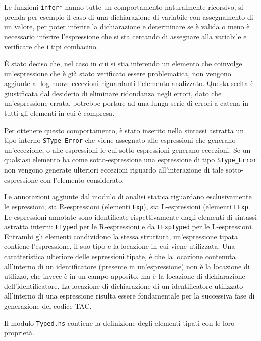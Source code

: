 Le funzioni \texttt{infer*} hanno tutte un comportamento naturalmente ricorsivo, si prenda per esempio il caso di una dichiarazione di variabile con assegnamento di un valore, per poter inferire la dichiarazione e determinare se è valida o meno è necessario inferire l'espressione che si sta cercando di assegnare alla variabile e verificare che i tipi combacino.

È stato deciso che, nel caso in cui si stia inferendo un elemento che coinvolge un'espressione che è già stato verificato essere problematica, non vengono aggiunte al log nuove eccezioni riguardanti l'elemento analizzato. Questa scelta è giustificata dal desiderio di eliminare ridondanza negli errori, dato che un'espressione errata, potrebbe portare ad una lunga serie di errori a catena in tutti gli elementi in cui è compresa.

Per ottenere questo comportamento, è stato inserito nella sintassi astratta un tipo interno \texttt{SType\_Error} che viene assegnato alle espressioni che generano un'eccezione, o alle espressioni le cui sotto-espressioni generano eccezioni. Se un qualsiasi elemento ha come sotto-espressione una espressione di tipo \texttt{SType\_Error} non vengono generate ulteriori eccezioni riguardo all'interazione di tale sotto-espressione con l'elemento considerato.

Le annotazioni aggiunte dal modulo di analisi statica riguardano esclusivamente le espressioni, sia R-espressioni (elementi \texttt{Exp}), sia L-espressioni (elementi \texttt{LExp}. Le espressioni annotate sono identificate rispettivamente dagli elementi di sintassi astratta interni: \texttt{ETyped} per le R-espressioni e da \texttt{LExpTyped} per le L-espressioni. Entrambi gli elementi condividono la stessa struttura, un'espressione tipata contiene l'espressione, il suo tipo e la locazione in cui viene utilizzata. Una caratteristica ulteriore delle espressioni tipate, è che la locazione contenuta all'interno di un identificatore (presente in un'espressione) non è la locazione di utilizzo, che invece è in un campo apposito, ma è la locazione di dichiarazione dell'identificatore.
La locazione di dichiarazione di un identificatore utilizzato all'interno di una espressione risulta essere fondamentale per la successiva fase di generazione del codice TAC.


Il modulo \texttt{Typed.hs} contiene la definizione degli elementi tipati con le loro proprietà.



